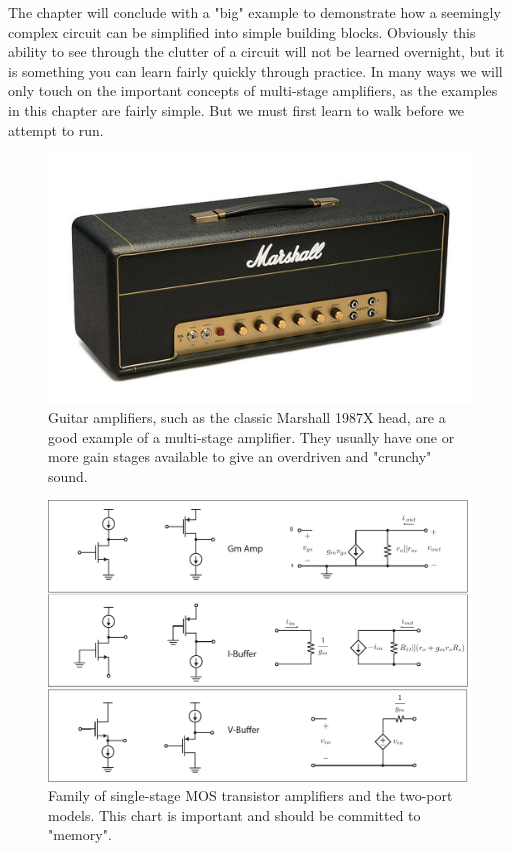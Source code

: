 The chapter will conclude with a "big" example to demonstrate how a seemingly complex circuit can be simplified into simple building blocks.  Obviously this ability to see through the clutter of a circuit will not be learned overnight, but it is something you can learn fairly quickly through practice.  In many ways we will only touch on the important concepts of multi-stage amplifiers, as the examples in this chapter are fairly simple.  But we must first learn to walk before we attempt to run.
\begin{figure}[H]
\centering
\includegraphics[scale=0.25]{1987x_head}
\caption{Guitar amplifiers, such as the classic Marshall 1987X head, are a good example of a multi-stage amplifier.  They usually have one or more gain stages available to give an overdriven and "crunchy" sound.}
\label{fig:ch15_intro}
\end{figure}
\newpage
\begin{figure}[tb]
\centering
\includegraphics[width=\columnwidth]{ampchart_models}
\caption{Family of single-stage MOS transistor amplifiers and the two-port models.  This chart is important and should be committed to "memory".}
\label{fig:ampchart_models_fig}
\end{figure}
